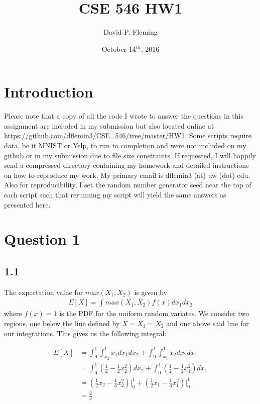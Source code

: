 \documentclass[12pt]{amsart}
\title{CSE 546 HW1}
\author{David P. Fleming}
\date{October 14$^{th}$, 2016}
\begin{document}
\maketitle
\tableofcontents

\section*{Introduction}

Please note that a copy of all the code I wrote to answer the questions in this assignment are included in my submission but also located online at \url{https://github.com/dflemin3/CSE_546/tree/master/HW1}.  Some scripts require data, be it MNIST or Yelp, to run to completion and were not included on my github or in my submission due to file size constraints.  If requested, I will happily send a compressed directory containing my homework and detailed instructions on how to reproduce my work.  My primary email is dflemin3 (at) uw (dot) edu.  Also for reproducibility, I set the random number generator seed near the top of each script such that rerunning my script will yield the same answers as presented here.


\section*{Question 1}

\subsection*{1.1}
The expectation value for $max(X_1, X_2)$ is given by
\begin{align}
E[X] = \int max(X_1,X_2) f(x) dx_1 dx_2
\end{align}
where $f(x) = 1$ is the PDF for the uniform random variates.  We consider two regions, one below the line defined by $X = X_1 = X_2$ and one above said line for our integrations.  This gives us the following integral:

\begin{equation} \label{eqn:1.1}
\begin{split}
E[X] & = \int_0^1 \int_{x_2}^1 x_1 dx_1 dx_2 + \int_0^1 \int_{x_1}^1 x_2 dx_2 dx_1 \\
& = \int_0^1 (\frac{1}{2} - \frac{1}{2}x_2^2) dx_2 + \int_0^1 (\frac{1}{2} - \frac{1}{2}x_1^2) dx_1 \\
& = (\frac{1}{2}x_2 - \frac{1}{6}x_2^2) \vert_0^1 + (\frac{1}{2}x_1 - \frac{1}{6}x_1^2) \vert_0^1 \\
& = \frac{2}{3}
\end{split}
\end{equation}
\end{document}
